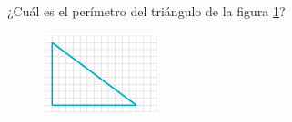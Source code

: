 
¿Cuál es el perímetro del triángulo de la figura \ref{fig:peri_rect_02}?
\begin{figure}[H]
    \begin{center}
        \includegraphics[width=0.3\textwidth]{../images/peri_rect_02.png}
    \end{center}
    \caption{}
    \label{fig:peri_rect_02}
\end{figure}